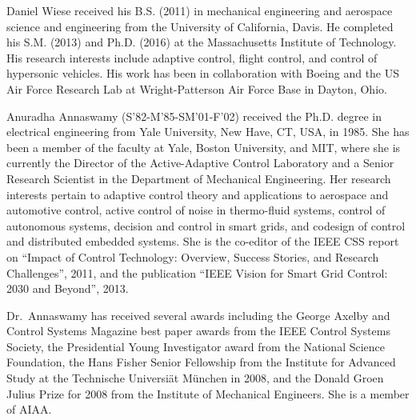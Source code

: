 \documentclass[journal]{IEEEtran}
\newcommand{\figurepath}{../fig/bio}
\begin{document}
  \onecolumn
  \begin{multicols}{2}

    \begin{IEEEbiography}{Daniel Wiese}
      received his B.S. (2011) in mechanical engineering and aerospace science and engineering from the University of California, Davis.
      He completed his S.M. (2013) and Ph.D. (2016) at the Massachusetts Institute of Technology.
      His research interests include adaptive control, flight control, and control of hypersonic vehicles.
      His work has been in collaboration with Boeing and the US Air Force Research Lab at Wright-Patterson Air Force Base in Dayton, Ohio.
    \end{IEEEbiography}

    \begin{IEEEbiography}{Anuradha Annaswamy}
      (S'82-M'85-SM'01-F'02) received the Ph.D. degree in electrical engineering from Yale University, New Have, CT, USA, in 1985.
      She has been a member of the faculty at Yale, Boston University, and MIT, where she is currently the Director of the Active-Adaptive Control Laboratory and a Senior Research Scientist in the Department of Mechanical Engineering.
      Her research interests pertain to adaptive control theory and applications to aerospace and automotive control, active control of noise in thermo-fluid systems, control of autonomous systems, decision and control in smart grids, and codesign of control and distributed embedded systems.
      She is the co-editor of the IEEE CSS report on ``Impact of Control Technology: Overview, Success Stories, and Research Challenges'', 2011, and the publication ``IEEE Vision for Smart Grid Control: 2030 and Beyond'', 2013.

      Dr.\ Annaswamy has received several awards including the George Axelby and Control Systems Magazine best paper awards from the IEEE Control Systems Society, the Presidential Young Investigator award from the National Science Foundation, the Hans Fisher Senior Fellowship from the Institute for Advanced Study at the Technische Universi{\"a}t M{\"u}nchen in 2008, and the Donald Groen Julius Prize for 2008 from the Institute of Mechanical Engineers.
      She is a member of AIAA.\@
    \end{IEEEbiography}


\end{multicols}
\end{document}
